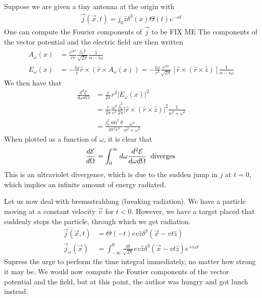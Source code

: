 \begin{ex}
    Suppose we are given a tiny antenna at the origin with
    \begin{align*}
        \vec{j}(\vec{x},t)=j_0 \hat{z}\delta^3(x)\Theta(t)e^{-\alpha t}
    \end{align*}
    One can compute the Fourier components of $\vec{j}$ to be
    FIX ME
    The components of the vector potential and the electric field are then written
    \begin{align*}
        A_\omega(x)&=\frac{e^{ikr}}{cr}\frac{j_0\hat{r}}{\sqrt{2\pi}}\frac{1}{\alpha-i\omega}\\
        E_\omega(x)&=-\frac{i\omega}{c}\hat{r}\times\left( \hat{r}\times A_\omega(x) \right)=-\frac{i\omega}{c^2}\frac{e^{ikr}}{\sqrt{2\pi}}\left[ \hat{r}\times\left( \hat{r}\times\hat{z} \right) \right]\frac{1}{\alpha-i\omega}
    \end{align*}
    We then have that
    \begin{align*}
        \frac{d^2\mathcal{E}}{d\omega d\Omega}&=\frac{c}{2\pi}r^2|E_\omega(x)|^2\\
        &=\frac{c}{2\pi}\frac{\omega^2}{c^4}\frac{j_0^2}{2\pi}|\hat{r}\times\left( \hat{r}\times\hat{z} \right)|^2 \frac{1}{\alpha^2+\omega^2}\\
        &=\frac{j_0^2\sin^2\theta}{4\pi^2c^3}\frac{\omega^2}{\alpha^2+\omega^2}
    \end{align*}
    When plotted as a function of $\omega$, it is clear that
    \begin{align*}
        \frac{d\mathcal{E}}{d\Omega}=\int_0^\infty d\omega \frac{d^2\mathcal{E}}{d\omega d\Omega}\;\;\textnormal{diverges}\;
    \end{align*}
    This is an ultraviolet divergence, which is due to the sudden jump in $j$ at $t=0$, which implies an infinite amount of energy radiated.
\end{ex}

\begin{ex}
    Let us now deal with bremsstrahlung (breaking radiation). We have a particle moving at a constant velocity $\vec{v}$ for $t<0$. However,
    we have a target placed that suddenly stops the particle, through which we get radiation.
    \begin{align*}
        \vec{j}(\vec{x},t)&=\Theta(-t) ev\hat{z}\delta^3(\vec{x}-vt\hat{z})\\
        \vec{j}_\omega(\vec{x})&=\int_{-\infty}^0\frac{dt}{\sqrt{2\pi}}e v \hat{z} \delta^3(\vec{x}-vt\hat{z})e^{+i\omega t}
    \end{align*}
    Supress the urge to perform the time integral immediately, no matter how strong it may be. We would now compute the Fourier components of the vector potential and the field, but
    at this point, the author was hungry and got lunch instead.
\end{ex}
